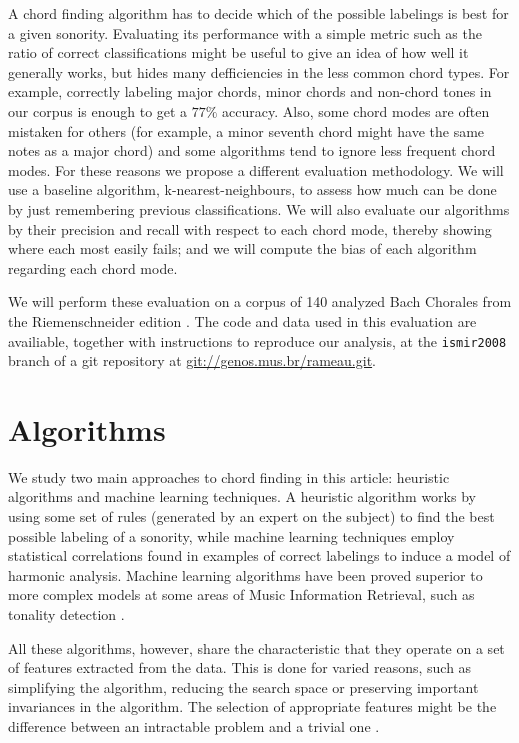 \documentclass{article}
\newcommand{\comment}[1]{}
\begin{document}
A chord finding algorithm has to decide which of the possible
labelings is best for a given sonority. Evaluating its performance
with a simple metric such as the ratio of correct classifications
might be useful to give an idea of how well it generally works, but
hides many defficiencies in the less common chord types. For example,
correctly labeling major chords, minor chords and non-chord tones in
our corpus is enough to get a $77\%$ accuracy. Also, some chord modes
are often mistaken for others (for example, a minor seventh chord
might have the same notes as a major chord) and some algorithms tend
to ignore less frequent chord modes. For these reasons we propose a
different evaluation methodology. We will use a baseline algorithm,
k-nearest-neighbours, to assess how much can be done by just
remembering previous classifications. We will also evaluate our
algorithms by their precision and recall with respect to each chord
mode, thereby showing where each most easily fails; and we will
compute the bias of each algorithm regarding each chord mode.

We will perform these evaluation on a corpus of 140 analyzed Bach
Chorales from the Riemenschneider edition \cite{bach:371}. The code
and data used in this evaluation are availiable, together with
instructions to reproduce our analysis, at the \texttt{ismir2008}
branch of a git \cite{baudis:git} repository at
\url{git://genos.mus.br/rameau.git}.

\section{Algorithms}
\label{sec:algorithms}

\comment{
  ==> features usadas pelos algoritmos
  ==> técnicas variadas: busca X learning
}

We study two main approaches to chord finding in this article:
heuristic algorithms and machine learning techniques. A heuristic
algorithm works by using some set of rules (generated by an expert on
the subject) to find the best possible labeling of a sonority, while
machine learning techniques employ statistical correlations found in
examples of correct labelings to induce a model of harmonic
analysis. Machine learning algorithms have been proved superior to
more complex models at some areas of Music Information Retrieval, such
as tonality detection \cite{gomez.ea:estimating}.

All these algorithms, however, share the characteristic that they
operate on a set of features extracted from the data. This is done for
varied reasons, such as simplifying the algorithm, reducing the search
space or preserving important invariances in the algorithm. The
selection of appropriate features might be the difference between an
intractable problem and a trivial one \cite{duda.ea:statistical}.
\end{document}
